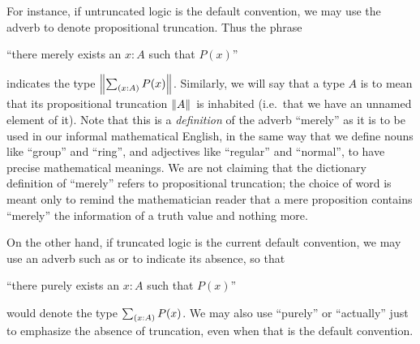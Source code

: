 For instance, if untruncated logic is the default convention, we may use the adverb 
%
to denote propositional truncation.
Thus the phrase
\begin{center}
  ``there merely exists an $x:A$ such that $P(x)$''
\end{center}
indicates the type $\brck{\sm{x:A} P(x)}$.
Similarly, we will say that a type $A$ is 
%
%
to mean that its propositional truncation $\mathopen{}\left\Vert A\right\Vert_{}\mathclose{}$ is inhabited (i.e.\ that we have an unnamed element of it).
Note that this is a \emph{definition} of the adverb ``merely'' as it is to be used in our informal mathematical English, in the same way that we define nouns like ``group'' and ``ring'', and adjectives like ``regular'' and ``normal'', to have precise mathematical meanings.
We are not claiming that the dictionary definition of ``merely'' refers to propositional truncation; the choice of word is meant only to remind the mathematician reader that a mere proposition contains ``merely'' the information of a truth value and nothing more.

On the other hand, if truncated logic is the current default convention, we may use an adverb such as 
%
or  to indicate its absence, so that
\begin{center}
``there purely exists an $x:A$ such that $P(x)$''
\end{center}
would denote the type $\sm{x:A} P(x)$.
We may also use ``purely'' or ``actually'' just to emphasize the absence of truncation, even when that is the default convention.

